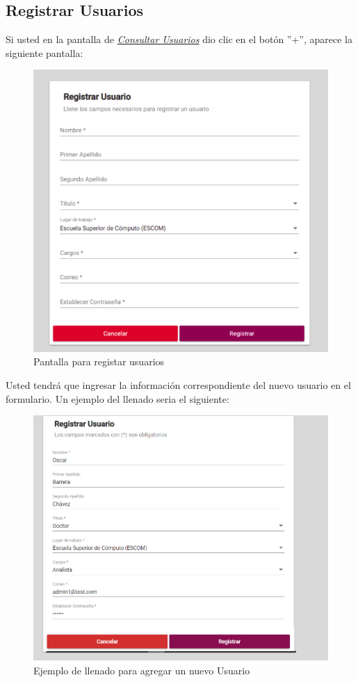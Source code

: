     \newpage
        \hypertarget{registrarUs}{}
        \subsection{Registrar Usuarios}
            Si usted  en la pantalla de \hyperlink{consultarUs}{\textit{Consultar Usuarios}} dio clic en el botón ''+'', aparece la siguiente pantalla:

            \begin{figure}[!hbtp]
                \centering
                \hypertarget{registrarUs}{\includegraphics[width=0.7\linewidth]{images/SP5/Registro-Usuario-vacio}}
                \caption{Pantalla para registar usuarios}
                \label{registrarrh}
            \end{figure}

            Usted tendrá que ingresar la información correspondiente del nuevo usuario en el formulario. Un ejemplo del llenado seria el siguiente:

            \begin{figure}[!hbtp]
                \centering
                \hypertarget{ejreg}{\includegraphics[width=0.7\linewidth]{images/SP5/Registro-Usuario-UA}}
                \caption{Ejemplo de llenado para agregar un nuevo Usuario}
                \label{ejreg}
            \end{figure}

